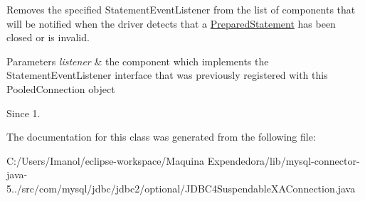 Removes the specified {\ttfamily Statement\+Event\+Listener} from the list of components that will be notified when the driver detects that a {\ttfamily \mbox{\hyperlink{classcom_1_1mysql_1_1jdbc_1_1_prepared_statement}{Prepared\+Statement}}} has been closed or is invalid.


\begin{DoxyParams}{Parameters}
{\em listener} & the component which implements the {\ttfamily Statement\+Event\+Listener} interface that was previously registered with this {\ttfamily Pooled\+Connection} object \\
\hline
\end{DoxyParams}
\begin{DoxySince}{Since}
1. 
\end{DoxySince}


The documentation for this class was generated from the following file\+:\begin{DoxyCompactItemize}
\item 
C\+:/\+Users/\+Imanol/eclipse-\/workspace/\+Maquina Expendedora/lib/mysql-\/connector-\/java-\/5../src/com/mysql/jdbc/jdbc2/optional/J\+D\+B\+C4\+Suspendable\+X\+A\+Connection.\+java\end{DoxyCompactItemize}
